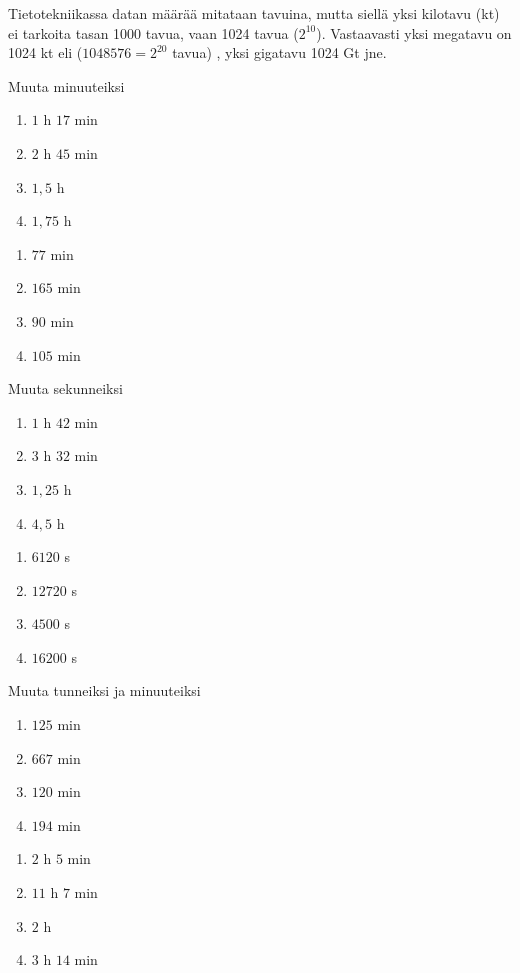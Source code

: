 Tietotekniikassa datan määrää mitataan tavuina, mutta siellä yksi kilotavu (kt) ei tarkoita tasan 1000 tavua,  vaan 1024 tavua ($2^{10}$). Vastaavasti yksi megatavu on 1024 kt eli ($1048576 = 2^{20}$ tavua) , yksi gigatavu 1024 Gt jne.

\begin{tehtava}
Muuta minuuteiksi
\begin{enumerate}
\item $1$ h $17$ min
\item $2$ h $45$ min
\item $1,5$ h
\item $1,75$ h
\end{enumerate}
\begin{vastaus}
\begin{enumerate}
\item $77$ min
\item $165$ min
\item $90$ min
\item $105$ min
\end{enumerate}
\end{vastaus}
\end{tehtava}

\begin{tehtava}
Muuta sekunneiksi
\begin{enumerate}
\item $1$ h $42$ min
\item $3$ h $32$ min
\item $1,25$ h
\item $4,5$ h
\end{enumerate}
\begin{vastaus}
\begin{enumerate}
\item $6120$ s
\item $12720$ s
\item $4500$ s
\item $16200$ s
\end{enumerate}
\end{vastaus}
\end{tehtava}

\begin{tehtava}
Muuta tunneiksi ja minuuteiksi
\begin{enumerate}
\item $125$ min
\item $667$ min
\item $120$ min
\item $194$ min
\end{enumerate}
\begin{vastaus}
\begin{enumerate}
\item $2$ h $5$ min
\item $11$ h $7$ min
\item $2$ h
\item $3$ h $14$ min
\end{enumerate}
\end{vastaus}
\end{tehtava}


